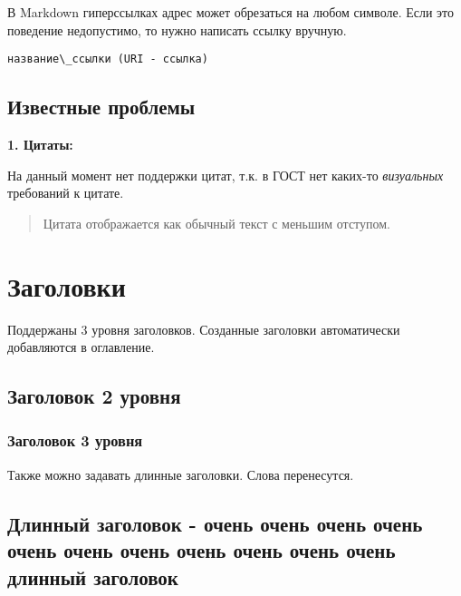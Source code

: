 \documentclass[a4paper]{article}
\renewcommand{\emph}[1]{\textit{#1}}
\newcommand{\passthrough}[1]{{\codefont #1}}
\begin{document}
В Markdown гиперссылках адрес может обрезаться на любом символе. Если
это поведение недопустимо, то нужно написать ссылку вручную.

\passthrough{\lstinline!название\_ссылки (URI - ссылка)!}

\subsection{Известные
проблемы}\label{ux438ux437ux432ux435ux441ux442ux43dux44bux435-ux43fux440ux43eux431ux43bux435ux43cux44b}

\textbf{1. Цитаты:}

На данный момент нет поддержки цитат, т.к. в ГОСТ нет каких-то
\emph{визуальных} требований к цитате.

\begin{quote}
Цитата отображается как обычный текст с меньшим отступом.
\end{quote}

\section{Заголовки}\label{ux437ux430ux433ux43eux43bux43eux432ux43aux438}

Поддержаны 3 уровня заголовков. Созданные заголовки автоматически
добавляются в оглавление.

\subsection{Заголовок 2
уровня}\label{ux437ux430ux433ux43eux43bux43eux432ux43eux43a-2-ux443ux440ux43eux432ux43dux44f}

\subsubsection{Заголовок 3
уровня}\label{ux437ux430ux433ux43eux43bux43eux432ux43eux43a-3-ux443ux440ux43eux432ux43dux44f}

Также можно задавать длинные заголовки. Слова перенесутся.

\subsection{Длинный заголовок - очень очень очень очень очень очень
очень очень очень очень очень длинный
заголовок}\label{ux434ux43bux438ux43dux43dux44bux439-ux437ux430ux433ux43eux43bux43eux432ux43eux43a---ux43eux447ux435ux43dux44c-ux43eux447ux435ux43dux44c-ux43eux447ux435ux43dux44c-ux43eux447ux435ux43dux44c-ux43eux447ux435ux43dux44c-ux43eux447ux435ux43dux44c-ux43eux447ux435ux43dux44c-ux43eux447ux435ux43dux44c-ux43eux447ux435ux43dux44c-ux43eux447ux435ux43dux44c-ux43eux447ux435ux43dux44c-ux434ux43bux438ux43dux43dux44bux439-ux437ux430ux433ux43eux43bux43eux432ux43eux43a}
\end{document}
